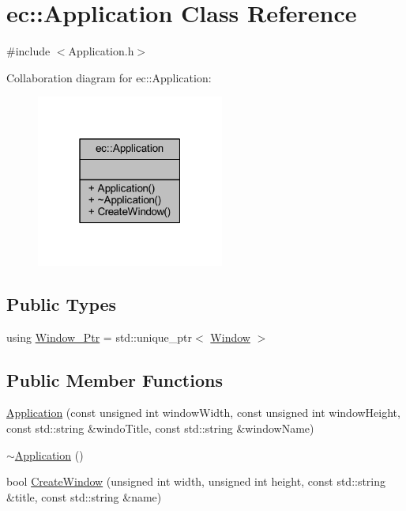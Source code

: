 \hypertarget{classec_1_1_application}{}\section{ec\+:\+:Application Class Reference}
\label{classec_1_1_application}


{\ttfamily \#include $<$Application.\+h$>$}



Collaboration diagram for ec\+:\+:Application\+:
\nopagebreak
\begin{figure}[H]
\begin{center}
\leavevmode
\includegraphics[width=175pt]{classec_1_1_application__coll__graph}
\end{center}
\end{figure}
\subsection*{Public Types}
\begin{DoxyCompactItemize}
\item 
using \mbox{\hyperlink{classec_1_1_application_af1e09a0f1b603eab8d3245d8b8075ad5}{Window\+\_\+\+Ptr}} = std\+::unique\+\_\+ptr$<$ \mbox{\hyperlink{classec_1_1_window}{Window}} $>$
\end{DoxyCompactItemize}
\subsection*{Public Member Functions}
\begin{DoxyCompactItemize}
\item 
\mbox{\hyperlink{classec_1_1_application_aeb940e0d02a540322cb43daa21e6e0cc}{Application}} (const unsigned int window\+Width, const unsigned int window\+Height, const std\+::string \&windo\+Title, const std\+::string \&window\+Name)
\item 
\mbox{\hyperlink{classec_1_1_application_abe00fd469062e9710bfda9f9d13765f3}{$\sim$\+Application}} ()
\item 
bool \mbox{\hyperlink{classec_1_1_application_ae542514441629578de091652e0153359}{Create\+Window}} (unsigned int width, unsigned int height, const std\+::string \&title, const std\+::string \&name)
\end{DoxyCompactItemize}


